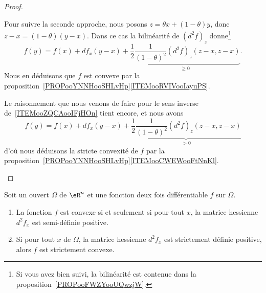 \begin{proof}
\begin{subproof}
		Pour suivre la seconde approche, nous posons \( z=\theta x+(1-\theta)y\), donc \( z-x=(1-\theta)(y-x)\). Dans ce cas la bilinéarité de \( (d^2f)_z\) donne\footnote{Si vous avez bien suivi, la bilinéarité est contenue dans la proposition~\ref{PROPooFWZYooUQwzjW}.}
		\begin{equation}
			f(y)=f(x)+df_x(y-x)+\underbrace{\frac{ 1 }{2}\frac{1}{ (1-\theta)^2 }(d^2f)_z(z-x,z-x)}_{\geq 0}.
		\end{equation}
		Nous en déduisons que \( f\) est convexe par la proposition~\ref{PROPooYNNHooSHLvHp}\ref{ITEMooRVIVooIayuPS}.

		\spitem[\ref{ITEMooHAGQooYZyhQk}]

		Le raisonnement que nous venons de faire pour le sens inverse de~\ref{ITEMooZQCAooIFjHOn} tient encore, et nous avons
		\begin{equation}
			f(y)=f(x)+df_x(y-x)+\underbrace{\frac{ 1 }{2}\frac{1}{ (1-\theta)^2 }(d^2f)_z(z-x,z-x)}_{> 0}
		\end{equation}
		d'où nous déduisons la stricte convexité de \( f\) par la proposition~\ref{PROPooYNNHooSHLvHp}\ref{ITEMooCWEWooFtNnKl}.
	\end{subproof}
\end{proof}


\begin{corollary}       \label{CORooMBQMooWBAIIH}
	Soit un ouvert \( \Omega\) de \( \eR^n\) et une fonction deux fois différentiable \( f\) sur \( \Omega\).
	\begin{enumerate}
		\item   \label{ITEMooUAFTooXfCviI}
		      La fonction \( f\) est convexe si et seulement si pour tout \( x\), la matrice hessienne \( d^2f_x\) est semi-définie positive.
		\item   \label{ITEMooDGISooPlRLOd}
		      Si pour tout \( x\) de \( \Omega\), la matrice hessienne \( d^2f_x\) est strictement définie positive, alors \( f \) est strictement convexe.
	\end{enumerate}
\end{corollary}

